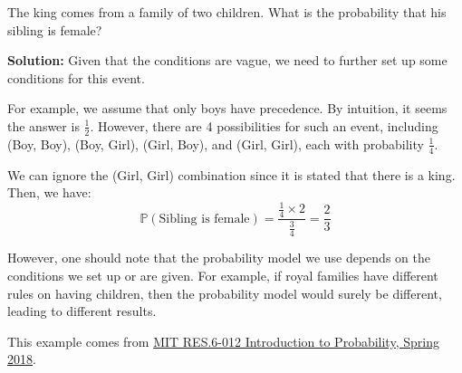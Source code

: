 \begin{eg}
    The king comes from a family of two children. What is the probability that his sibling is female?  

    \textbf{Solution:} Given that the conditions are vague, we need to further set up some conditions for this event.  

    For example, we assume that only boys have precedence. By intuition, it seems the answer is \(\frac{1}{2}\). However, there are 4 possibilities for such an event, including (Boy, Boy), (Boy, Girl), (Girl, Boy), and (Girl, Girl), each with probability \(\frac{1}{4}\).  

    We can ignore the (Girl, Girl) combination since it is stated that there is a king. Then, we have:  
    \[
        \mathbb{P}(\text{Sibling is female}) = \dfrac{\frac{1}{4} \times 2}{\frac{3}{4}} = \dfrac{2}{3}
    \]  

    However, one should note that the probability model we use depends on the conditions we set up or are given. For example, if royal families have different rules on having children, then the probability model would surely be different, leading to different results.  
    
    \begin{remark}
        This example comes from \href{https://ocw.mit.edu/RES-6-012S18}{MIT RES.6-012 Introduction to Probability, Spring 2018}. 
    \end{remark}
\end{eg}

